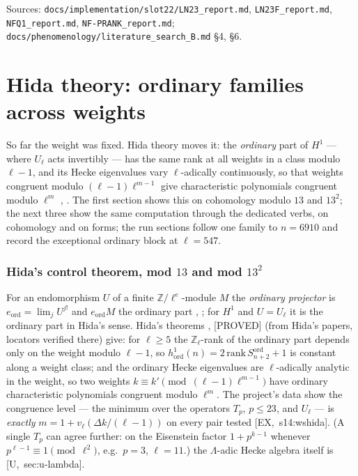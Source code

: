 \documentclass[11pt]{article}
\newcommand{\Z}{\mathbb{Z}}
\newcommand{\Zl}{\mathbb{Z}_\ell}
\newcommand{\pfile}[1]{\nolinkurl{#1}}
\newcommand{\PROVED}{\textsf{\small[PROVED]}}
\begin{document}
\noindent Sources: \pfile{docs/implementation/slot22/LN23_report.md}, \pfile{LN23F_report.md}, \pfile{NFQ1_report.md},
\pfile{NF-PRANK_report.md}; \pfile{docs/phenomenology/literature_search_B.md} \S4, \S6.

\part{Hida theory: ordinary families across weights}\label{part:pg-hida}

So far the weight was fixed. Hida theory moves it: the \emph{ordinary} part of $H^{1}$ --- where $U_\ell$ acts invertibly --- has the same
rank at all weights in a class modulo $\ell-1$, and its Hecke eigenvalues vary $\ell$-adically continuously, so that weights congruent modulo
$(\ell-1)\ell^{m-1}$ give characteristic polynomials congruent modulo $\ell^{m}$ {}, {}.
The first section shows this on cohomology modulo $13$ and $13^{2}$; the next three show the same computation through the dedicated verbs,
on cohomology and on forms; the run sections follow one family to $n=6910$ and record the exceptional ordinary block at $\ell=547$.

\section{Hida's control theorem, mod \texorpdfstring{$13$}{13} and mod \texorpdfstring{$13^{2}$}{13 squared}}\label{sec:pg-hida}

For an endomorphism $U$ of a finite $\Z/\ell^{e}$-module $M$ the \emph{ordinary projector} is $e_{\mathrm{ord}}=\lim_j U^{j!}$ and
$e_{\mathrm{ord}}M$ the ordinary part {}, {}; for $H^{1}$ and $U=U_\ell$ it is the
ordinary part in Hida's sense. Hida's theorems {}, {} \PROVED{} (from Hida's papers,
locators verified there) give: for $\ell\ge5$ the $\Zl$-rank of the ordinary part depends only on the weight modulo $\ell-1$, so
$h^{1}_{\mathrm{ord}}(n)=2\,\mathrm{rank}\,S^{\mathrm{ord}}_{n+2}+1$ is constant along a weight class; and the ordinary Hecke eigenvalues are
$\ell$-adically analytic in the weight, so two weights $k\equiv k'\pmod{(\ell-1)\ell^{m-1}}$ have ordinary characteristic polynomials congruent
modulo $\ell^{m}$. The project's data show the congruence level --- the minimum over the operators $T_p$, $p\le23$, and $U_\ell$ --- is \emph{exactly}
$m=1+v_\ell(\Delta k/(\ell-1))$ on every pair tested [EX,~s14:wshida]. (A single $T_p$ can agree further: on the Eisenstein factor
$1+p^{k-1}$ whenever $p^{\ell-1}\equiv1\pmod{\ell^{2}}$, e.g.\ $p=3$, $\ell=11$.) the $\Lambda$-adic Hecke algebra itself is [U,~sec:u-lambda].
\end{document}
